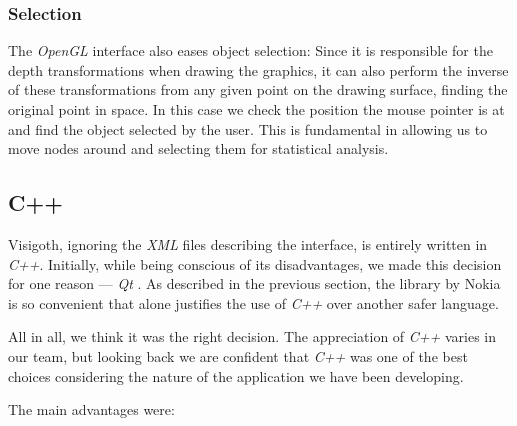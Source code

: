 \documentclass[a4paper,11pt,titlepage]{article}
\newcommand{\buzz}[1]{\emph{#1}}
\newcommand{\Qt}{\buzz{Qt} }
\newcommand{\OpenGL}{\buzz{OpenGL} }
\begin{document}
\subsubsection{Selection}
The \OpenGL interface also eases object selection: Since it is
responsible for the depth transformations when drawing the graphics,
it can also perform the inverse of these transformations from any
given point on the drawing surface, finding the original point in
space. In this case we check the position the mouse pointer is at and
find the object selected by the user. This is fundamental in allowing
us to move nodes around and selecting them for statistical analysis.

\subsection{C++}

Visigoth, ignoring the \buzz{XML} files describing the interface, is
entirely written in \buzz{C++}. Initially, while being conscious of
its disadvantages, we made this decision for one reason ---
\buzz{\Qt}. As described in the previous section, the library by Nokia
is so convenient that alone justifies the use of \buzz{C++} over
another safer language.

All in all, we think it was the right decision. The appreciation of
\buzz{C++} varies in our team, but looking back we are confident that
\buzz{C++} was one of the best choices considering the nature of the
application we have been developing.

The main advantages were:
\end{document}
